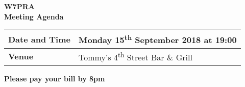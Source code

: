 \documentclass[letter,11pt]{extarticle}
\begin{document}
	\thispagestyle{empty}
	
	\begin{center}
		\textbf{W7PRA\\Meeting Agenda}
		\vspace{0.33cm}
	\end{center}
	
	\begin{center}
		\begin{tabular}{| m{3.0cm} | m{7.5cm} |} \hline
			\textbf{Date and Time} & Monday 15\textsuperscript{th} September 2018 at 19:00 \\ \hline
			\textbf{Venue} & Tommy's 4\textsuperscript{th} Street Bar \& Grill \\ \hline
				\end{tabular}
	\end{center}
	
	\begin{center}
		\textbf{Please pay your bill by 8pm}
	\end{center}
	
\end{document}
